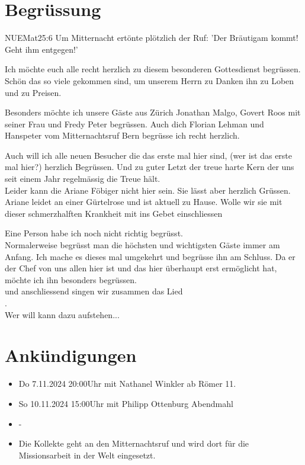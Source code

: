 
\section{Begrüssung}

\begin{bibelbox}{NUE}{Mat}{25:6}
Um Mitternacht ertönte plötzlich der Ruf: 'Der Bräutigam kommt! Geht ihm entgegen!'
\end{bibelbox}
Ich möchte euch alle recht herzlich zu diesem besonderen Gottesdienst begrüssen. Schön das so viele gekommen sind, um unserem Herrn zu Danken ihn zu Loben und zu Preisen.

Besonders möchte ich unsere Gäste aus Zürich Jonathan Malgo, Govert Roos mit seiner Frau  und Fredy Peter begrüssen. Auch dich Florian Lehman und Hanspeter vom Mitternachtsruf Bern begrüsse ich recht herzlich.

Auch will ich alle neuen Besucher die das erste mal hier sind, (wer ist das erste mal hier?) herzlich Begrüssen. Und zu guter Letzt der treue harte Kern der uns seit einem Jahr regelmässig die Treue hält.\\
Leider kann die Ariane Föbiger nicht hier sein. Sie lässt aber herzlich Grüssen. Ariane leidet an einer Gürtelrose und ist aktuell zu Hause. Wolle wir sie mit dieser schmerzhalften Krankheit mit ins Gebet einschliessen 

Eine Person habe ich noch nicht richtig begrüsst. \\
Normalerweise begrüsst man die höchsten und wichtigsten Gäste immer am Anfang. Ich mache es dieses mal umgekehrt und begrüsse ihn am Schluss. Da er der Chef von uns allen hier ist und das hier überhaupt erst ermöglicht hat, möchte ich ihn besonders begrüssen.\\
\beten{} und anschliessend singen wir zusammen das Lied\\
.\\
Wer will kann dazu aufstehen...

\section{Ankündigungen}
\begin{itemize}
    \item {} Do 7.11.2024 20:00Uhr mit Nathanel Winkler ab Römer 11.
    \item {} So 10.11.2024 15:00Uhr mit Philipp Ottenburg Abendmahl
    \item {} -
    \item {} Die Kollekte geht an den Mitternachtsruf und wird dort für die Missionsarbeit in der Welt eingesetzt.
\end{itemize}


